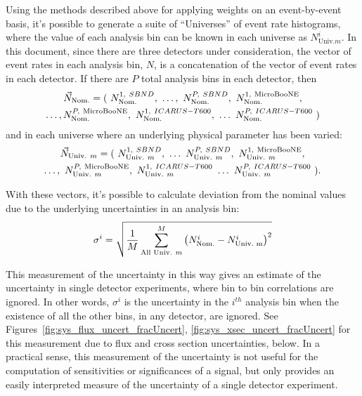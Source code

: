 Using the methods described above for applying weights on an event-by-event basis, it's possible to generate a suite of ``Universes'' of event rate histograms, where the value of each analysis bin can be known in each universe as $N^i_{\text{Univ.} m}.$  In this document, since there are three detectors under consideration, the vector of event rates in each analysis bin, $N$, is a concatenation of the vector of event rates in each detector.  If there are $P$ total analysis bins in each detector, then 
\begin{multline}
\vec{N}_{\text{Nom.}} = (~N_{\text{Nom.}}^{1,~SBND},~\dots, ~N_{\text{Nom.}}^{P,~SBND},~N_{\text{Nom.}}^{1,~\text{MicroBooNE}}, \\ 
\dots,N_{\text{Nom.}}^{P,~\text{MicroBooNE}},~N_{\text{Nom.}}^{1,~ICARUS-T600},~\dots~N_{\text{Nom.}}^{P,~ICARUS-T600} ~)
\end{multline}
and in each universe where an underlying physical parameter has been varied:
\begin{multline}
\vec{N}_{\text{Univ.}~m} = (~N_{\text{Univ.}~m}^{1,~SBND},~\dots~N_{\text{Univ.}~m}^{P,~SBND},~N_{\text{Univ.}~m}^{1,~\text{MicroBooNE}}, \\
\dots,~N_{\text{Univ.}~m}^{P,~\text{MicroBooNE}},~N_{\text{Univ.}~m}^{1,~ICARUS-T600}~\dots~N_{\text{Univ.}~m}^{P,~ICARUS-T600} ~).
\end{multline}

With these vectors, it's possible to calculate deviation from the nominal values due to the underlying uncertainties in an analysis bin:
\begin{equation}
\begin{centering}
\sigma^i = \sqrt{\frac{1}{M}\sum_{\text{All Univ.}~m}^{M} \left( N^i_{\text{Nom.}} - N^i_{\text{Univ.~m}}\right)^2}
\end{centering}
\label{eq:bin_uncert}
\end{equation}

This measurement of the uncertainty in this way gives an estimate of the uncertainty in single detector experiments, where bin to bin correlations are ignored.  In other words, $\sigma^i$ is the uncertainty in the $i^{th}$ analysis bin when the existence of all the other bins, in any detector, are ignored.  See Figures~\ref{fig:sys_flux_uncert_fracUncert}, \ref{fig:sys_xsec_uncert_fracUncert} for this measurement due to flux and cross section uncertainties, below.  In a practical sense, this measurement of the uncertainty is not useful for the computation of sensitivities or significances of a signal, but only provides an easily interpreted measure of the uncertainty of a single detector experiment.

